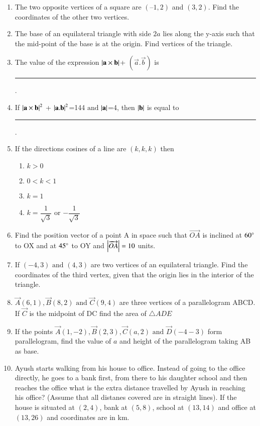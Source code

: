 \begin{enumerate}[label=\thesubsection.\arabic*,ref=\thesubsection.\theenumi]
\item The two opposite vertices of a square are $(–1, 2)$  and $ (3, 2)$. Find the coordinates of the other two vertices.
\\
\solution
	
\item The base of an equilateral triangle with side $2a$ lies along the y-axis such that the mid-point of the base is at the origin. Find vertices of the triangle.
\label{chapters/11/10/1/2}

\item The value of the expression $\left\vert\mathbf{a}\times\mathbf{b}\right\vert$+ $({\vec{a}.\vec{b}})$ is \rule{1cm}{0.15mm}.
\item If $\left\vert\mathbf{a}\times\mathbf{b}\right\vert^2$ + $\left\vert\mathbf{a}.\mathbf{b}\right\vert^2$=144 $\text{and}$  $\left\vert\mathbf{a}\right\vert$=4, then $\left\vert\mathbf{b}\right\vert$ is equal to \rule{1cm}{0.15mm}.
\item If the directions cosines of a line are $(k,k,k)$ then
\begin{enumerate}
	\item $k>0$
	\item $0<k<1$
	\item $k=1$ 
	\item $k=\dfrac{1}{\sqrt{3}}$ or $-\dfrac{1}{\sqrt{3}}$
\end{enumerate}
\item  Find the position vector of a point A in space such that $\overrightarrow{OA}$ is inclined at $60 \degree$ to OX and at $45 \degree$ to OY and $\left\vert\overrightarrow{OA}\right\vert =10$ units.
\item If $(-4,3)\text{ and }(4,3)$ are two vertices of an equilateral triangle. Find the coordinates of the third vertex, given that the origin lies in the interior of the triangle. 
\item $\vec{A} (6,1),\vec{B}(8,2) \text{ and } \vec{C}(9,4)$ are three vertices of a parallelogram ABCD. If $\vec{C}$ is the midpoint of DC find the area of $\triangle ADE$
\item If the points  $\vec{A}(1,-2), \vec{B}(2,3) , \vec{C}(a,2)\text{ and }\vec{D} (-4-3)$ form parallelogram, find the value of $a$ and height of the parallelogram taking AB as base.
\item Ayush starts walking from his house to office. Instead of going to the office directly, he goes to a bank first, from there to his daughter school and then reaches the office what is the extra distance travelled by Ayush in reaching his office? (Assume that all distanes covered are in straight lines). If the house is situated at $(2,4)$, bank at $(5,8)$, school at $(13,14)$ and office at $(13,26)$ and coordinates are in km.

\end{enumerate}
